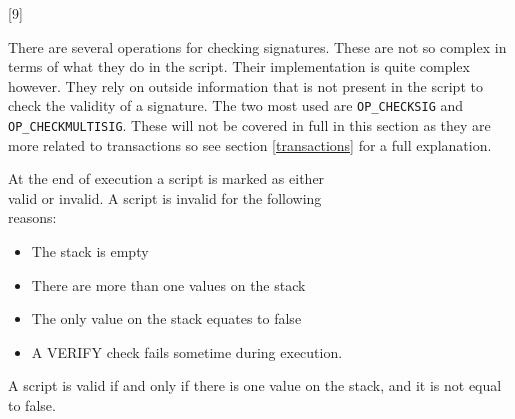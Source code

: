 \vspace{7mm}
[9]

There are several operations for checking signatures. These are not so complex in terms of what they do in the script. Their implementation is quite complex however. They rely on outside information that is not present in the script to check the validity of a signature. The two most used are \texttt{OP\_CHECKSIG} and \texttt{OP\_CHECKMULTISIG}. These will not be covered in full in this section as they are more related to transactions so see section \ref{transactions} for a full explanation. 

\label{script_valid}
At the end of execution a script is marked as either \\valid or invalid. A script is invalid for the following \\reasons:

\begin{itemize}
	\item The stack is empty
	\item There are more than one values on the stack
	\item The only value on the stack equates to false
	\item A VERIFY check fails sometime during execution.
\end{itemize}

A script is valid if and only if there is one value on the stack, and it is not equal to false.
